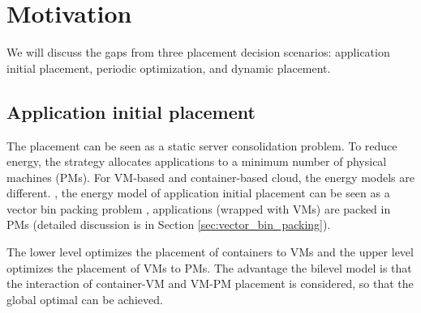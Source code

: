 
\section{Motivation}
\label{sec:motivation}
We will discuss the gaps from three placement decision scenarios: application initial placement, periodic optimization, and dynamic placement.

\subsection{Application initial placement}
 The placement can be seen as a static server consolidation problem. To reduce energy, the strategy allocates applications to a minimum number of physical machines (PMs). For VM-based and container-based cloud, the energy models are different.
, the energy model of application initial placement can be seen as a vector bin packing problem \cite{Leinberger:1999fs}, applications (wrapped with VMs) are packed in PMs (detailed discussion is in Section \ref{sec:vector_bin_packing}).

 The lower level optimizes the placement of containers to VMs and the upper level optimizes the placement of VMs to PMs. The advantage the bilevel model is that the interaction of container-VM and VM-PM placement is considered, so that the global optimal can be achieved.

